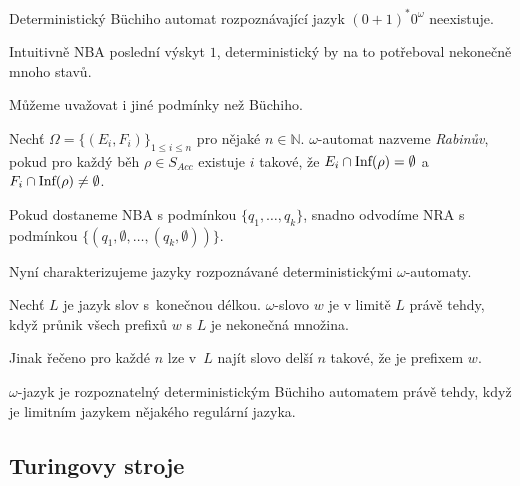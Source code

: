 \begin{claim}
    Deterministický Büchiho automat rozpoznávající jazyk
    $(0+1)^*0^\omega$ neexistuje.
\end{claim}

Intuitivně NBA  poslední výskyt $1$,
deterministický by na to potřeboval nekonečně mnoho stavů.

Můžeme uvažovat i jiné podmínky než Büchiho.

\begin{definition}
    Nechť $\Omega = \{(E_i, F_i)\}_{1 \leq i \leq n}$ pro nějaké
    $n \in \mathbb{N}$.
    $\omega$-automat nazveme {\em Rabinův},
    pokud pro každý běh $\rho \in S_{Acc}$
    existuje $i$ takové, že \linebreak
    $E_i \cap \text{Inf}(\rho) = \emptyset$
    a
    $F_i \cap \text{Inf}(\rho) \neq \emptyset$.
\end{definition}

Pokud dostaneme NBA s podmínkou $\{q_1, \ldots, q_k\}$,
snadno odvodíme NRA s podmínkou $\{(q_1, \emptyset, \ldots, (q_k, \emptyset))\}$.

\begin{example}
\end{example}

Nyní charakterizujeme jazyky rozpoznávané deterministickými $\omega$-automaty.

\begin{definition}
    Nechť $L$ je jazyk slov s~konečnou délkou.
    $\omega$-slovo $w$ je v limitě $L$ právě tehdy,
    když průnik všech prefixů $w$ s $L$ je nekonečná množina.
\end{definition}

Jinak řečeno pro každé $n$ lze v~$L$ najít slovo delší $n$ takové, že
je prefixem $w$.

\begin{theorem}
$\omega$-jazyk je rozpoznatelný deterministickým Büchiho automatem
právě tehdy, když je limitním jazykem nějakého regulární jazyka.
\end{theorem}


\subsection{Turingovy stroje}

